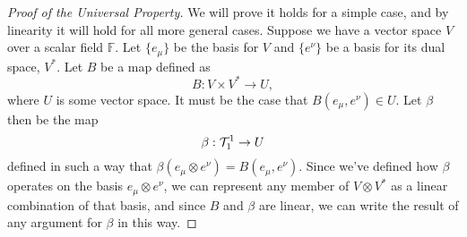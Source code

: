 \begin{proof}[Proof of the Universal Property]
We will prove it holds for a simple case, and by linearity it will hold for all more general cases.
Suppose we have a vector space $V$ over a scalar field $\mathbb{F}$.
Let $\{e_\mu\}$ be the basis for $V$ and $\{e^\nu\}$ be a basis for its dual space, $V^*$.
Let $B$ be a map defined as 
\[ B : V \times V^* \to U, \]
where $U$ is some vector space.
It must be the case that $B(e_\mu, e^\nu) \in U$.
Let $\beta$ then be the map
\[ \beta : \mathcal{T}^1_1 \to U \]
defined in such a way that $\beta(e_\mu \otimes e^\nu) = B(e_\mu,e^\nu)$.
Since we've defined how $\beta$ operates on the basis $e_\mu \otimes e^\nu$, we can represent any member of $V \otimes V^*$ as a linear combination of that basis, and since $B$ and $\beta$ are linear, we can write the result of any argument for $\beta$ in this way.
\end{proof}

